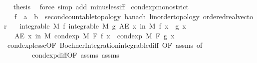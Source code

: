 \begin{isabellebody}
\ \isamarkupfalse%
\ {\isacharquery}{\kern0pt}thesis\ \isamarkupfalse%
\ {\isacharparenleft}{\kern0pt}force\ simp\ add{\isacharcolon}{\kern0pt}\ minus{\isacharunderscore}{\kern0pt}less{\isacharunderscore}{\kern0pt}iff{\isacharparenright}{\kern0pt}\isanewline
{}\isamarkupfalse%
%
\endisatagproof
{\isafoldproof}%
%
\isadelimproof
\isanewline
%
\endisadelimproof
\isanewline
{}\isamarkupfalse%
\ cond{\isacharunderscore}{\kern0pt}exp{\isacharunderscore}{\kern0pt}mono{\isacharunderscore}{\kern0pt}strict{\isacharcolon}{\kern0pt}\isanewline
\ \ \ f\ {\isacharcolon}{\kern0pt}{\isacharcolon}{\kern0pt}\ {\isachardoublequoteopen}{\isacharprime}{\kern0pt}a\ {\isasymRightarrow}\ {\isacharprime}{\kern0pt}b\ {\isacharcolon}{\kern0pt}{\isacharcolon}{\kern0pt}\ {\isacharbraceleft}{\kern0pt}second{\isacharunderscore}{\kern0pt}countable{\isacharunderscore}{\kern0pt}topology{\isacharcomma}{\kern0pt}\ banach{\isacharcomma}{\kern0pt}\ linorder{\isacharunderscore}{\kern0pt}topology{\isacharcomma}{\kern0pt}\ ordered{\isacharunderscore}{\kern0pt}real{\isacharunderscore}{\kern0pt}vector{\isacharbraceright}{\kern0pt}{\isachardoublequoteclose}\isanewline
\ \ \ {\isachardoublequoteopen}integrable\ M\ f{\isachardoublequoteclose}\ {\isachardoublequoteopen}integrable\ M\ g{\isachardoublequoteclose}\ {\isachardoublequoteopen}AE\ x\ in\ M{\isachardot}{\kern0pt}\ f\ x\ {\isacharless}{\kern0pt}\ g\ x{\isachardoublequoteclose}\isanewline
\ \ \ {\isachardoublequoteopen}AE\ x\ in\ M{\isachardot}{\kern0pt}\ cond{\isacharunderscore}{\kern0pt}exp\ M\ F\ f\ x\ {\isacharless}{\kern0pt}\ cond{\isacharunderscore}{\kern0pt}exp\ M\ F\ g\ x{\isachardoublequoteclose}\isanewline
%
\isadelimproof
\ \ %
\endisadelimproof
%
\isatagproof
{}\isamarkupfalse%
\ cond{\isacharunderscore}{\kern0pt}exp{\isacharunderscore}{\kern0pt}less{\isacharunderscore}{\kern0pt}c{\isacharbrackleft}{\kern0pt}OF\ Bochner{\isacharunderscore}{\kern0pt}Integration{\isachardot}{\kern0pt}integrable{\isacharunderscore}{\kern0pt}diff{\isacharcomma}{\kern0pt}\ OF\ assms{\isacharparenleft}{\kern0pt}{}{\isacharcomma}{\kern0pt}{}{\isacharparenright}{\kern0pt}{\isacharcomma}{\kern0pt}\ of\ {}{\isacharbrackright}{\kern0pt}\ \isanewline
\ \ \ \ \ \ \ \ cond{\isacharunderscore}{\kern0pt}exp{\isacharunderscore}{\kern0pt}diff{\isacharbrackleft}{\kern0pt}OF\ assms{\isacharparenleft}{\kern0pt}{}{\isacharcomma}{\kern0pt}{}{\isacharparenright}{\kern0pt}{\isacharbrackright}{\kern0pt}\ assms{\isacharparenleft}{\kern0pt}{}{\isacharparenright}{\kern0pt}\ \isamarkupfalse%

\end{isabellebody}
